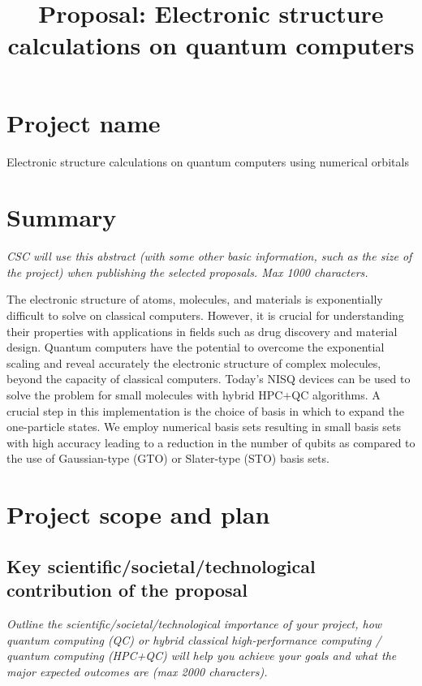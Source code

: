 \documentclass[english,a4paper,12pt]{article}
\title{Proposal: Electronic structure calculations on quantum computers
}
\author{}
\date{}
\begin{document}
\maketitle

\section{Project name}

Electronic structure calculations on quantum computers using numerical orbitals

\section{Summary}

\emph{CSC will use this abstract (with some other basic information, such as the size of the project) when publishing the selected proposals. Max 1000 characters.}

The electronic structure of atoms, molecules, and materials is exponentially difficult to solve on classical computers. However, it is crucial for understanding their properties with applications in fields such as drug discovery and material design. Quantum computers have the potential to overcome the exponential scaling and reveal accurately the electronic structure of complex molecules, beyond the capacity of classical computers. Today's NISQ devices can be used to solve the problem for small molecules with hybrid HPC+QC algorithms. A crucial step in this implementation is the choice of basis in which to expand the one-particle states. We employ numerical basis sets resulting in small basis sets with high accuracy leading to a reduction in the number of qubits as compared to the use of Gaussian-type (GTO) or Slater-type (STO) basis sets.

\section{Project scope and plan}

\subsection{Key scientific/societal/technological contribution of the proposal}

\emph{Outline the scientific/societal/technological importance of your project, how quantum computing (QC) or hybrid classical high-performance computing / quantum computing (HPC+QC) will help you achieve your goals and what the major expected outcomes are (max 2000 characters).}
\end{document}
